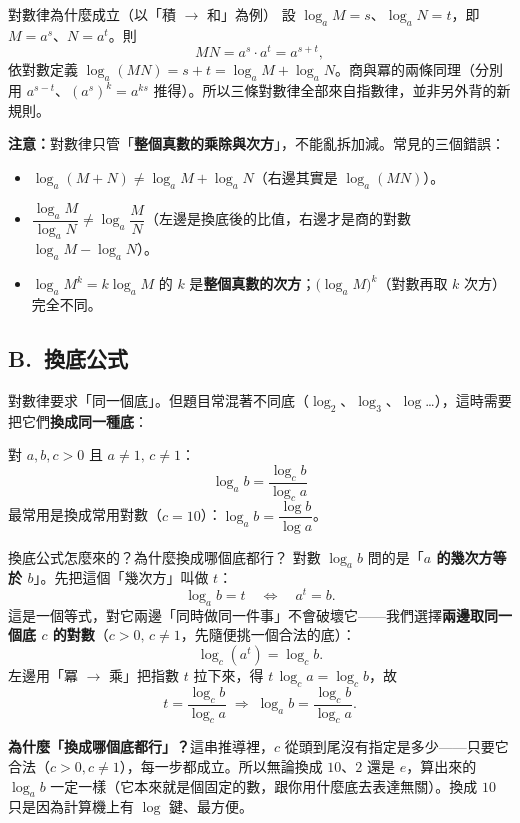 \documentclass[11pt]{article}
\begin{document}
\begin{補充框}{對數律為什麼成立（以「積 $\to$ 和」為例）}
設 $\log_a M=s$、$\log_a N=t$，即 $M=a^s$、$N=a^t$。則
$$MN=a^s\cdot a^t=a^{s+t},$$
依對數定義 $\log_a(MN)=s+t=\log_a M+\log_a N$。商與冪的兩條同理（分別用 $a^{s-t}$、$(a^s)^k=a^{ks}$ 推得）。所以三條對數律全部來自指數律，並非另外背的新規則。
\end{補充框}

\textbf{注意：}對數律只管「\textbf{整個真數的乘除與次方}」，不能亂拆加減。常見的三個錯誤：
\begin{itemize}\setlength{\itemsep}{1pt}
\item $\log_a(M+N)\ne\log_a M+\log_a N$（右邊其實是 $\log_a(MN)$）。
\item $\dfrac{\log_a M}{\log_a N}\ne\log_a\dfrac{M}{N}$（左邊是換底後的比值，右邊才是商的對數 $\log_a M-\log_a N$）。
\item $\log_a M^k=k\log_a M$ 的 $k$ 是\textbf{整個真數的次方}；$\big(\log_a M\big)^k$（對數再取 $k$ 次方）完全不同。
\end{itemize}

\subsection*{\sffamily B.\ 換底公式}

對數律要求「同一個底」。但題目常混著不同底（$\log_2$、$\log_3$、$\log$…），這時需要把它們\textbf{換成同一種底}：

\begin{center}
對 $a,b,c>0$ 且 $a\ne1,\,c\ne1$：
$$\boxed{\;\log_a b=\frac{\log_c b}{\log_c a}\;}$$
最常用是換成常用對數（$c=10$）：$\log_a b=\dfrac{\log b}{\log a}$。
\end{center}

\begin{補充框}{換底公式怎麼來的？為什麼換成哪個底都行？}
對數 $\log_a b$ 問的是「\textbf{$a$ 的幾次方等於 $b$}」。先把這個「幾次方」叫做 $t$：
$$\log_a b=t\quad\Longleftrightarrow\quad a^{t}=b.$$
這是一個等式，對它兩邊「同時做同一件事」不會破壞它——我們選擇\textbf{兩邊取同一個底 $c$ 的對數}（$c>0,\,c\ne1$，先隨便挑一個合法的底）：
$$\log_c\!\left(a^{t}\right)=\log_c b.$$
左邊用「冪 $\to$ 乘」把指數 $t$ 拉下來，得 $t\,\log_c a=\log_c b$，故
$$t=\frac{\log_c b}{\log_c a}\;\Longrightarrow\;\log_a b=\frac{\log_c b}{\log_c a}.$$

\textbf{為什麼「換成哪個底都行」？}這串推導裡，$c$ 從頭到尾沒有指定是多少——只要它合法（$c>0,c\ne1$），每一步都成立。所以無論換成 $10$、$2$ 還是 $e$，算出來的 $\log_a b$ 一定一樣（它本來就是個固定的數，跟你用什麼底去表達無關）。換成 $10$ 只是因為計算機上有 $\log$ 鍵、最方便。
\end{補充框}
\end{document}
